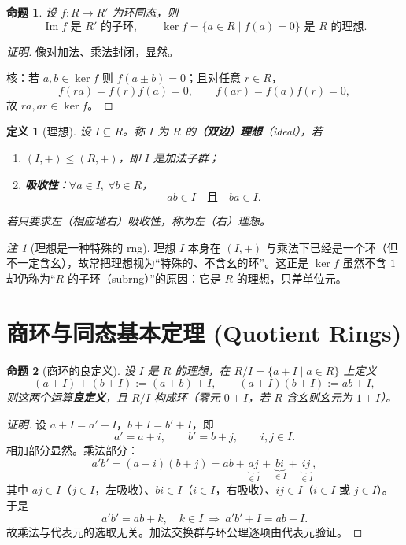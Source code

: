 \documentclass[11pt,a4paper]{ctexart}
\newtheorem*{definition}{定义}
\newtheorem*{proposition}{命题}
\theoremstyle{remark}
\newtheorem*{remark}{注}
\begin{document}
\begin{proposition}
设 $f:R\to R'$ 为环同态，则
\[
\operatorname{Im}f \text{ 是 } R' \text{ 的子环},\qquad \ker f=\{a\in R\mid f(a)=0\} \text{ 是 } R \text{ 的理想}.
\]
\end{proposition}

\begin{proof}[证明]
像对加法、乘法封闭，显然。

核：若 $a,b\in\ker f$ 则 $f(a\pm b)=0$；且对任意 $r\in R$，
\[
f(ra)=f(r)f(a)=0,\qquad f(ar)=f(a)f(r)=0,
\]
故 $ra,ar\in\ker f$。
\end{proof}

\begin{definition}[理想]
设 $I\subseteq R$。称 $I$ 为 $R$ 的\textbf{（双边）理想}（ideal），若
\begin{enumerate}
    \item $(I,+)\le (R,+)$，即 $I$ 是加法子群；
    \item \textbf{吸收性}：$\forall a\in I,\ \forall b\in R$，
    \[
    ab\in I \quad\text{且}\quad ba\in I .
    \]
\end{enumerate}
若只要求左（相应地右）吸收性，称为左（右）理想。
\end{definition}

\begin{remark}[理想是一种特殊的 rng]
理想 $I$ 本身在 $(I,+)$ 与乘法下已经是一个环（但不一定含幺），故常把理想视为“特殊的、不含幺的环”。这正是 $\ker f$ 虽然不含 $1$ 却仍称为“$R$ 的子环（subrng）”的原因：它是 $R$ 的理想，只差单位元。
\end{remark}

\section*{商环与同态基本定理 (Quotient Rings)}

\begin{proposition}[商环的良定义]
设 $I$ 是 $R$ 的理想，在 $R/I=\{a+I\mid a\in R\}$ 上定义
\[
(a+I)+(b+I):=(a+b)+I,\qquad (a+I)(b+I):=ab+I ,
\]
则这两个运算\textbf{良定义}，且 $R/I$ 构成环（零元 $0+I$，若 $R$ 含幺则幺元为 $1+I$）。
\end{proposition}

\begin{proof}[证明]
设 $a+I=a'+I$，$b+I=b'+I$，即
\[
a'=a+i,\qquad b'=b+j,\qquad i,j\in I .
\]
相加部分显然。乘法部分：
\[
a'b'=(a+i)(b+j)=ab+\underbrace{aj}_{\in I}+\underbrace{bi}_{\in I}+\underbrace{ij}_{\in I},
\]
其中 $aj\in I$（$j\in I$，左吸收）、$bi\in I$（$i\in I$，右吸收）、$ij\in I$（$i\in I$ 或 $j\in I$）。于是
\[
a'b'=ab+k,\quad k\in I\ \Longrightarrow\ a'b'+I=ab+I .
\]
故乘法与代表元的选取无关。加法交换群与环公理逐项由代表元验证。
\end{proof}
\end{document}
